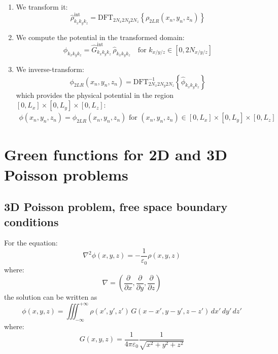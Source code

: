 \begin{enumerate}
\item We transform it:
\begin{equation}
\hat{\rho}^\text{int}_{k_x k_y k_z} = 
\text{DFT}_{2N_x 2N_y 2N_z}\left\{ \rho_{2LR}(x_n, y_n, z_n)\right\}
\end{equation}
\item We compute the potential in the transformed domain:
\begin{equation}
\hat{\phi}_{k_x k_y k_z} = \hat{G}^\text{int}_{k_x k_y k_z} \, \hat{\rho}_{k_x k_y k_z} \quad \text{for } k_{x/y/z}\in [0, 2N_{x/y/z}]
\end{equation}
\item We inverse-transform:
\begin{equation}
\phi_{2LR}(x_n, y_n, z_n)  = \text{DFT}_{2N_x 2N_y 2N_z}^{-1}
\left\{\hat{\phi}_{k_x k_y k_z}\right\}
\end{equation}
which provides the physical potential in the region $[0, L_x]\times[0, L_y]\times[0, L_z]$:
\begin{multline}
\phi(x_n, y_n, z_n) = \phi_{2LR}(x_n, y_n, z_n)  
\text{ for } (x_n, y_n, z_n) \in [0, L_x]\times[0, L_y]\times[0, L_z]
\end{multline}
\end{enumerate}

\section{Green functions for 2D and 3D Poisson problems}

\subsection*{3D Poisson problem, free space boundary conditions}

For the equation:
\begin{equation}
\nabla^2 \phi(x,y,z) = -\frac{1}{\varepsilon_0} \rho(x,y,z)
\end{equation}
where:
\begin{equation}
\nabla = \left(\frac{\partial}{\partial x}, 
                      \frac{\partial}{\partial y},
                      \frac{\partial}{\partial z} \right)
\end{equation}
the solution can be written as 
\begin{equation}
\phi(x, y, z) = \iiint_{-\infty}^{+\infty} \rho(x', y', z')
   \,G(x-x', y-y', z-z')\,dx'\,dy'\,dz'
\end{equation}
where:
\begin{equation}
G(x, y, z) = \frac{1}{4\pi\varepsilon_0}\frac{1}{
\sqrt{x^2 +y^2 +z^2}
}
\end{equation}

